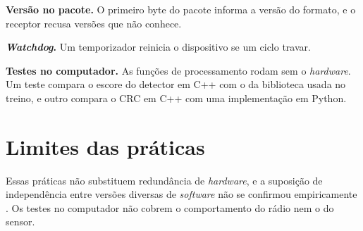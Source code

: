 \textbf{Versão no pacote.} O primeiro byte do pacote informa a versão do formato, e o receptor
recusa versões que não conhece.

\textbf{\emph{Watchdog}.} Um temporizador reinicia o dispositivo se um ciclo travar.

\textbf{Testes no computador.} As funções de processamento rodam sem o \emph{hardware}. Um teste
compara o escore do detector em C++ com o da biblioteca usada no treino, e outro compara o CRC
em C++ com uma implementação em Python.

\section{Limites das práticas}
\label{sec:ape-limites}

Essas práticas não substituem redundância de \emph{hardware}, e a suposição de independência
entre versões diversas de \emph{software} não se confirmou empiricamente \cite{knight1986}. Os
testes no computador não cobrem o comportamento do rádio nem o do sensor.
